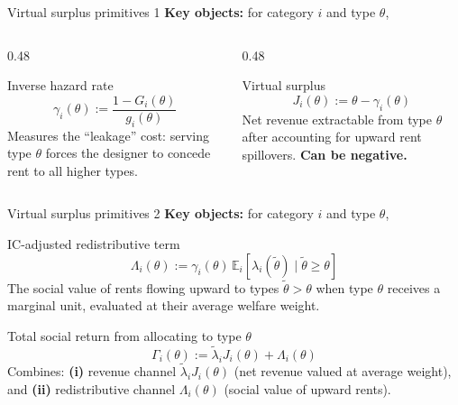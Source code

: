 \documentclass[10pt, aspectratio=169]{beamer}
\newcommand{\E}{\mathbb{E}}
\begin{document}
\begin{frame}{Virtual surplus primitives 1}
\textbf{Key objects:} for category $i$ and type $\theta$,
\begin{columns}
\begin{column}{0.48\textwidth}
\begin{block}{Inverse hazard rate}
\[ \gamma_i(\theta) := \frac{1 - G_i(\theta)}{g_i(\theta)} \]
Measures the ``leakage'' cost: serving type $\theta$ forces the designer to concede rent to all higher types.
\end{block}
\end{column}
\begin{column}{0.48\textwidth}
\begin{block}{Virtual surplus}
\[ J_i(\theta) := \theta - \gamma_i(\theta) \]
Net revenue extractable from type $\theta$ after accounting for upward rent spillovers. \textbf{Can be negative.}
\end{block}
\end{column}
\end{columns}

\end{frame}

\begin{frame}{Virtual surplus primitives 2}
\textbf{Key objects:} for category $i$ and type $\theta$,
\begin{block}{IC-adjusted redistributive term}
\[ \Lambda_i(\theta) := \gamma_i(\theta)\, \E_i\!\left[\lambda_i(\tilde{\theta}) \mid \tilde{\theta} \geq \theta\right] \]
The social value of rents flowing upward to types $\tilde\theta > \theta$ when type $\theta$ receives a marginal unit, evaluated at their average welfare weight.
\end{block}
\vspace{0.2cm}
\begin{block}{Total social return from allocating to type $\theta$}
\[ \Gamma_i(\theta) := \tilde{\lambda}_i J_i(\theta) + \Lambda_i(\theta) \]
Combines: \textbf{(i)} revenue channel $\tilde{\lambda}_i J_i(\theta)$ (net revenue valued at average weight), and \textbf{(ii)} redistributive channel $\Lambda_i(\theta)$ (social value of upward rents).
\end{block}
\end{frame}
\end{document}
